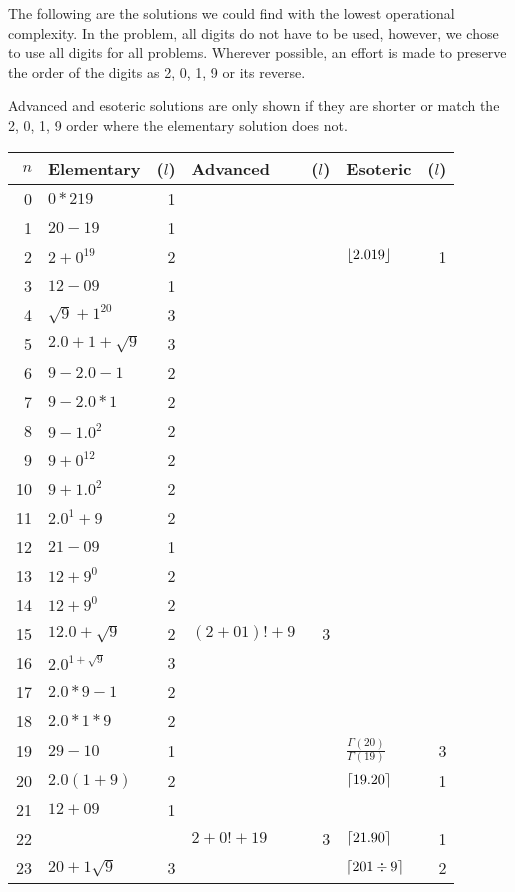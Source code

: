 The following are the solutions we could find with the lowest operational complexity.
In the problem, all digits do not have to be used, however, we chose to use all digits for all problems.
Wherever possible, an effort is made to preserve the order of the digits as 2, 0, 1, 9 or its reverse.

Advanced and esoteric solutions are only shown if they are shorter or match the 2, 0, 1, 9 order where the elementary solution does not.

\begin{longtable}{r l r l r l r}
\toprule
$n$ & Elementary & ($l$) & Advanced & ($l$) & Esoteric & ($l$) \\ \midrule
\endhead%
0 & $0*219$ & 1 \\ \midrule
1 & $20-19$ & 1 \\ \midrule
2 & $2+0^{19}$ & 2 & & & $\lfloor2.019\rfloor$ & 1 \\ \midrule
3 & $12-09$ & 1 \\ \midrule
4 & $\sqrt{9}+1^{20}$ & 3 \\ \midrule
5 & $2.0+1+\sqrt{9}$ & 3 \\ \midrule
6 & $9-2.0-1$ & 2 \\ \midrule
7 & $9-2.0*1$ & 2 \\ \midrule
8 & $9-1.0^{2}$ & 2 \\ \midrule
9 & $9+0^{12}$ & 2 \\ \midrule
\midrule
10 & $9+1.0^{2}$ & 2 \\ \midrule
11 & $2.0^{1}+9$ & 2 \\ \midrule
12 & $21-09$ & 1 \\ \midrule
13 & $12+9^0$ & 2 \\ \midrule
14 & $12+9^0$ & 2 \\ \midrule
15 & $12.0+\sqrt{9}$ & 2 & $(2+01)!+9$ & 3 \\ \midrule
16 & $2.0^{1+\sqrt{9}}$ & 3 \\ \midrule
17 & $2.0*9-1$ & 2& \\ \midrule
18 & $2.0*1*9$ & 2 \\ \midrule
19 & $29-10$ & 1 & & & $\frac{\Gamma(20)}{\Gamma(19)}$ & 3\\ \midrule
\midrule
20 & $2.0(1+9)$ & 2 & & & $\lceil19.20\rceil$ & 1 \\ \midrule
21 & $12+09$ & 1 \\ \midrule
22 & & & $2+0!+19$ & 3 & $\lceil21.90\rceil$ & 1 \\ \midrule
23 & $20+1\sqrt{9}$ & 3 & & & $\lceil201\div9\rceil$ & 2 \\ \midrule

\end{longtable}
